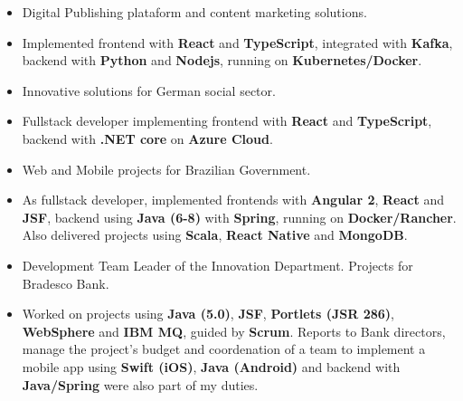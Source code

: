 \documentclass[10pt,a4paper,ragged2e,withhyper]{altacv}
\begin{document}
\begin{paracol}{2}


\begin{itemize}
\item Digital Publishing plataform and content marketing solutions.
\item Implemented frontend with \textbf{React} and \textbf{TypeScript}, integrated with \textbf{Kafka}, backend with \textbf{Python} and \textbf{Nodejs}, running on \textbf{Kubernetes/Docker}.
\end{itemize}
\divider

\begin{itemize}
\item Innovative solutions for German social sector.
\item Fullstack developer implementing frontend with \textbf{React} and \textbf{TypeScript}, backend
with \textbf{.NET core} on \textbf{Azure Cloud}.
\end{itemize}
\divider

\begin{itemize}
\item Web and Mobile projects for Brazilian Government.
\item As fullstack developer, implemented frontends with \textbf{Angular 2}, \textbf{React} and \textbf{JSF}, backend using \textbf{Java (6-8)} with \textbf{Spring}, running on \textbf{Docker/Rancher}.
Also delivered projects using \textbf{Scala}, \textbf{React Native} and \textbf{MongoDB}.
\end{itemize}
\divider

\begin{itemize}
\item Development Team Leader of the Innovation Department. Projects for Bradesco Bank.
\item Worked on projects using \textbf{Java (5.0)}, \textbf{JSF}, \textbf{Portlets (JSR 286)}, \textbf{WebSphere} and \textbf{IBM MQ}, guided by \textbf{Scrum}. Reports to Bank directors, manage the project's budget and coordenation of a team to implement a mobile app using \textbf{Swift (iOS)}, \textbf{Java (Android)} and backend with \textbf{Java/Spring} were also part of my duties.
\end{itemize}


\end{paracol}
\end{document}
